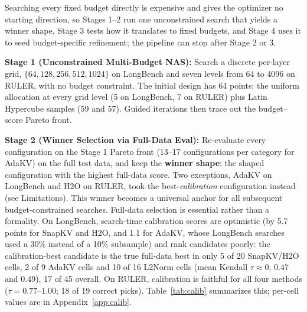 \documentclass[11pt]{article}
\begin{document}
Searching every fixed budget directly is expensive and gives the optimizer no starting direction, so Stages 1--2 run one unconstrained search that yields a winner shape, Stage 3 tests how it translates to fixed budgets, and Stage 4 uses it to seed budget-specific refinement; the pipeline can stop after Stage 2 or 3.

\textbf{Stage 1 (Unconstrained Multi-Budget NAS):} Search a discrete per-layer grid, $\{64,128,256,512,1024\}$ on LongBench and seven levels from 64 to 4096 on RULER, with no budget constraint. The initial design has 64 points: the uniform allocation at every grid level (5 on LongBench, 7 on RULER) plus Latin Hypercube samples (59 and 57). Guided iterations then trace out the budget--score Pareto front.

\textbf{Stage 2 (Winner Selection via Full-Data Eval):} Re-evaluate every configuration on the Stage 1 Pareto front (13--17 configurations per category for AdaKV) on the full test data, and keep the \textbf{winner shape}: the shaped configuration with the highest full-data score. Two exceptions, AdaKV on LongBench and H2O on RULER, took the best-\emph{calibration} configuration instead (see Limitations). This winner becomes a universal anchor for all subsequent budget-constrained searches. Full-data selection is essential rather than a formality. On LongBench, search-time calibration scores are optimistic (by 5.7 points for SnapKV and H2O, and 1.1 for AdaKV, whose LongBench searches used a 30\% instead of a 10\% subsample) and rank candidates poorly: the calibration-best candidate is the true full-data best in only 5 of 20 SnapKV/H2O cells, 2 of 9 AdaKV cells and 10 of 16 L2Norm cells (mean Kendall $\tau \approx 0$, $0.47$ and $0.49$), 17 of 45 overall. On RULER, calibration is faithful for all four methods ($\tau = 0.77$--$1.00$; 18 of 19 correct picks). Table~\ref{tab:calib} summarizes this; per-cell values are in Appendix~\ref{app:calib}.
\end{document}
